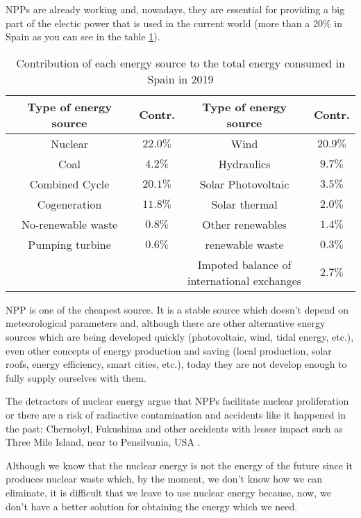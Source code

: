 NPPs are already working and, nowadays, they are essential for providing a big part of the electic power that is used in the current world (more than a 20\% in Spain as you can see in the table \ref{tab:PercentageEnergySpain}). 

\begin{table}[htbp]
\begin{center}
\begin{tabular}{|c|c|c|c|}
\hline
Type of energy source & Contr. & Type of energy source & Contr.  \\
\hline \hline
Nuclear & $22.0\%$ & Wind & $20.9\%$  \\ \hline
Coal & $4.2\%$ & Hydraulics & $9.7\%$  \\ \hline
Combined Cycle & $20.1\%$ & Solar Photovoltaic & $3.5\%$  \\ \hline
Cogeneration & $11.8\%$ & Solar thermal & $2.0\%$  \\ \hline
No-renewable waste & $0.8\%$ & Other renewables & $1.4\%$  \\ \hline
Pumping turbine & $0.6\%$ & renewable waste & $0.3\%$  \\ \hline
 &  & \parbox{11em}{\centering Impoted balance of\\  international exchanges} & $2.7\%$\\ \hline
\end{tabular}
\caption{Contribution of each energy source to the total energy consumed in Spain in 2019 \cite{PercentageEnergySpain}}
\label{tab:PercentageEnergySpain}
\end{center}
\end{table}

NPP is one of the cheapest source. It is a stable source which doesn't depend on  meteorological parameters and, although there are other alternative energy sources which are being developed quickly  (photovoltaic, wind, tidal energy, etc.), even other concepts of energy production and saving (local production, solar roofs, energy efficiency, smart cities, etc.), today they are not develop enough to fully supply ourselves with them.  

The detractors of nuclear energy argue that NPPs facilitate nuclear proliferation or there are a risk of radiactive contamination and accidents like it happened in the past: Chernobyl, Fukushima and other accidents with lesser impact such as Three Mile Island, near to Pensilvania, USA \cite{ThreeMileIsland}.

Although we know that the nuclear energy is not the energy of the future since it produces nuclear waste which, by the moment, we don't know how we can eliminate, it is difficult that we leave to use nuclear energy because, now, we don't have a better solution for obtaining the energy which we need. 

